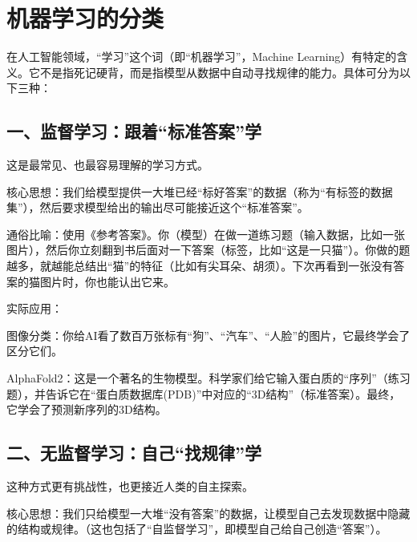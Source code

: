 \setcounter{section}{0}

\hypertarget{ux673aux5668ux5b66ux4e60ux7684ux5206ux7c7b}{%
\section{机器学习的分类}\label{ux673aux5668ux5b66ux4e60ux7684ux5206ux7c7b}}

在人工智能领域，``学习''这个词（即``机器学习''，Machine Learning）有特定的含义。它不是指死记硬背，而是指模型从数据中自动寻找规律的能力。具体可分为以下三种：

\hypertarget{ux4e00ux76d1ux7763ux5b66ux4e60ux8ddfux7740ux6807ux51c6ux7b54ux6848ux5b66}{%
\subsection{一、监督学习：跟着``标准答案''学}\label{ux4e00ux76d1ux7763ux5b66ux4e60ux8ddfux7740ux6807ux51c6ux7b54ux6848ux5b66}}

这是最常见、也最容易理解的学习方式。

核心思想：我们给模型提供一大堆已经``标好答案''的数据（称为``有标签的数据集''），然后要求模型给出的输出尽可能接近这个``标准答案''。

通俗比喻：使用《参考答案》。你（模型）在做一道练习题（输入数据，比如一张图片），然后你立刻翻到书后面对一下答案（标签，比如``这是一只猫''）。你做的题越多，就越能总结出``猫''的特征（比如有尖耳朵、胡须）。下次再看到一张没有答案的猫图片时，你也能认出它来。

实际应用：

图像分类：你给AI看了数百万张标有``狗''、``汽车''、``人脸''的图片，它最终学会了区分它们。

AlphaFold2：这是一个著名的生物模型。科学家们给它输入蛋白质的``序列''（练习题），并告诉它在``蛋白质数据库(PDB)''中对应的``3D结构''（标准答案）。最终，它学会了预测新序列的3D结构。

\hypertarget{ux4e8cux65e0ux76d1ux7763ux5b66ux4e60ux81eaux5df1ux627eux89c4ux5f8bux5b66}{%
\subsection{二、无监督学习：自己``找规律''学}\label{ux4e8cux65e0ux76d1ux7763ux5b66ux4e60ux81eaux5df1ux627eux89c4ux5f8bux5b66}}

这种方式更有挑战性，也更接近人类的自主探索。

核心思想：我们只给模型一大堆``没有答案''的数据，让模型自己去发现数据中隐藏的结构或规律。（这也包括了``自监督学习''，即模型自己给自己创造``答案''）。

